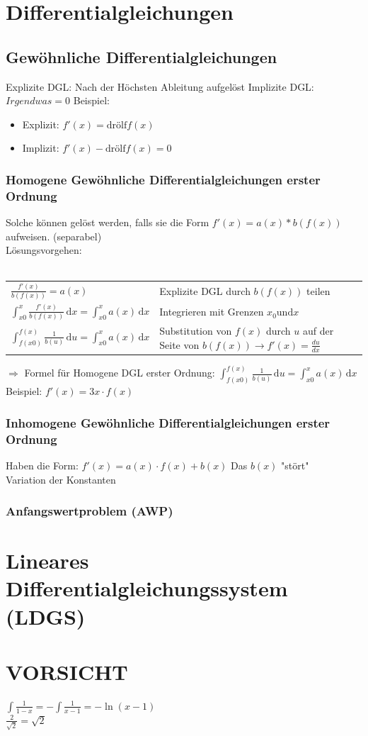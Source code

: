 \documentclass[a4paper,portrait]{scrartcl}
\begin{document}
\section{Differentialgleichungen}
\subsection{Gewöhnliche Differentialgleichungen}
Explizite DGL: Nach der Höchsten Ableitung aufgelöst
Implizite DGL: $Irgendwas = 0$
Beispiel:
\begin{itemize}
	\item Explizit: $f'(x) = \text{drölf} f(x)$
	\item Implizit: $f'(x) - \text{drölf} f(x) = 0$
\end{itemize}

\subsubsection{Homogene Gewöhnliche Differentialgleichungen erster Ordnung}
Solche können gelöst werden, falls sie die Form $f'(x) = a(x) * b(f(x)) $ aufweisen. (separabel) \\
Lösungsvorgehen: \\ \\
\begin{tabular}{ll}
	$\frac{f'(x)}{b(f(x))} = a(x)$ & Explizite DGL durch $b(f(x))$ teilen\\
	$\int_{x0}^{x}\!\frac{f'(x)}{b(f(x))}\,\mathrm{d}x = \int_{x0}^{x}\!a(x)\,\mathrm{d}x$ & Integrieren mit Grenzen $x_0 \text{und} x$ \\
	$\int_{f(x0)}^{f(x)}\!\frac{1}{b(u)}\,\mathrm{d}u = \int_{x0}^{x}\!a(x)\,\mathrm{d}x$&Substitution von $f(x)$ durch $u$ auf der Seite von $b(f(x)) \rightarrow f'(x) = \frac{du}{dx}$
\end{tabular}
$\Rightarrow$ Formel für Homogene DGL erster Ordnung: $\int_{f(x0)}^{f(x)}\!\frac{1}{b(u)}\,\mathrm{d}u = \int_{x0}^{x}\!a(x)\,\mathrm{d}x$\\
Beispiel: $f'(x) = 3x \cdot f(x)$ \\
\subsubsection{Inhomogene Gewöhnliche Differentialgleichungen erster Ordnung}
Haben die Form: $f'(x) = a(x) \cdot f(x) + b(x)$ Das $b(x)$ "stört" \\


Variation der Konstanten
\subsubsection{Anfangswertproblem (AWP)}

\section{Lineares Differentialgleichungssystem (LDGS)}

\section{VORSICHT}
$\int\frac{1}{1-x} = -\int\frac{1}{x-1} = -\ln(x-1)$ \\
$\frac{2}{\sqrt{2}} = \sqrt{2}$
\end{document}
